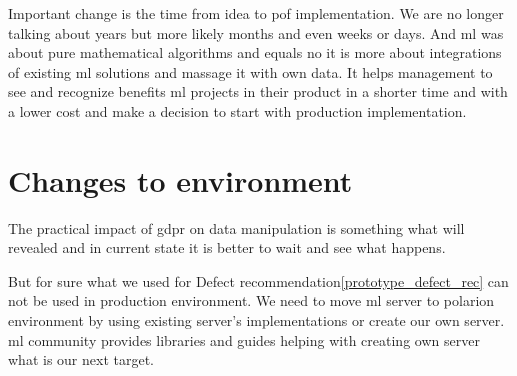 \documentclass[thesis=M,english]{FITthesis}[2012/06/26]
\begin{document}
Important change is the time from idea to \acrshort{pof} implementation. We are no longer talking about years but more likely months and even weeks or days. And \acrshort{ml} was about pure mathematical algorithms and equals no it is more about integrations of existing \acrshort{ml} solutions and massage it with own data. It helps management to see and recognize benefits \acrshort{ml} projects in their product in a shorter time and with a lower cost and make a decision to start with production implementation.

\section{Changes to environment}

The practical impact of \acrshort{gdpr} on data manipulation is something what will revealed and in current state it is better to wait and see what happens. 

But for sure what we used for Defect recommendation\ref{prototype_defect_rec} can not be used in production environment. We need to move \acrshort{ml} server to \acrshort{polarion} environment by using existing server's implementations or create our own server. \acrshort{ml} community provides libraries and guides helping with creating own server what is our next target.
\end{document}
